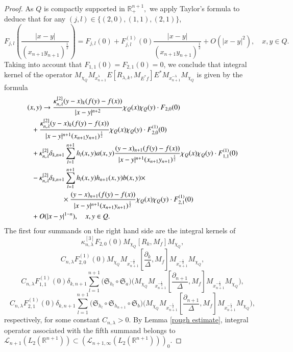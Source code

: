 \documentclass[12pt]{amsart}
\begin{document}
\begin{proof}
As $Q$ is compactly supported in $\mathbb{R}^{n+1}_+,$ we apply Taylor's formula to deduce that for any $(j,l)\in \{(2,0),(1,1),(2,1)\}$,
$$F_{j,l}(\frac{|x-y|}{(x_{n+1}y_{n+1})^{\frac12}})=F_{j,l}(0)+F_{j,l}^{(1)}(0)\frac{|x-y|}{(x_{n+1}y_{n+1})^{\frac12}}+O(|x-y|^2),\quad x,y\in Q.$$
Taking into account that $F_{1,1}(0)=F_{2,1}(0)=0$, we conclude that integral kernel of the operator $M_{\chi_Q} M_{x_{n+1}^{\lambda}}E[R_{\lambda,k},M_{E^{\ast}f}]E^{\ast}M_{x_{n+1}^{-\lambda}} M_{\chi_Q}$ is given by the formula
\begin{align*}
(x,y)&\to\frac{\kappa^{[2]}_{n,\lambda}(y-x)_k(f(y)-f(x))}{|x-y|^{n+2}}\chi_Q(x)\chi_Q(y)\cdot F_{2,0}(0)\\
&\hspace{-0.5cm}+\frac{\kappa^{[2]}_{n,\lambda}(y-x)_k(f(y)-f(x))}{|x-y|^{n+1}(x_{n+1}y_{n+1})^{\frac12}}\chi_Q(x)\chi_Q(y)\cdot F_{2,0}^{(1)}(0)\\
&\hspace{-0.5cm}+\kappa^{[2]}_{n,\lambda}\delta_{k,n+1}\sum_{l=1}^{n+1} h_l(x,y)a(x,y) \frac{(y-x)_{n+1}(f(y)-f(x))}{|x-y|^{n+1}(x_{n+1}y_{n+1})^{\frac12}}\chi_Q(x)\chi_Q(y)\cdot F_{1,1}^{(1)}(0)\\
&\hspace{-0.5cm}-\kappa^{[2]}_{n,\lambda}\delta_{k,n+1}\sum_{l=1}^{n+1} h_l(x,y)h_{n+1}(x,y)b(x,y)\times \\ &\hspace{1.0cm}\times\frac{(y-x)_{n+1}(f(y)-f(x))}{|x-y|^{n+1}(x_{n+1}y_{n+1})^{\frac12}}\chi_Q(x)\chi_Q(y)\cdot F_{2,1}^{(1)}(0)\\
&\hspace{-0.5cm}+O(|x-y|^{1-n}),\quad x,y\in Q.
\end{align*}
The first four summands on the right hand side are the integral kernels of
$$\kappa^{[3]}_{n,\lambda}F_{2,0}(0)M_{\chi_Q}[R_k,M_f]M_{\chi_Q},$$
$$C_{n,\lambda}F_{2,0}^{(1)}(0)M_{\chi_Q}M_{x_{n+1}^{-\frac12}}[\frac{\partial_k}{\Delta},M_f]M_{x_{n+1}^{-\frac12}}M_{\chi_Q},$$
$$C_{n,\lambda}F_{1,1}^{(1)}(0)\delta_{k,n+1}\sum_{l=1}^{n+1}\Big(\mathfrak{S}_{h_l}\circ\mathfrak{S}_a\Big)\Big(M_{\chi_Q}M_{x_{n+1}^{-\frac12}}[\frac{\partial_{n+1}}{\Delta},M_f]M_{x_{n+1}^{-\frac12}}M_{\chi_Q}\Big),$$
$$C_{n,\lambda}F_{2,1}^{(1)}(0)\delta_{k,n+1}\sum_{l=1}^{n+1}\Big(\mathfrak{S}_{h_l}\circ\mathfrak{S}_{h_{n+1}}\circ\mathfrak{S}_b\Big)\Big(M_{\chi_Q}M_{x_{n+1}^{-\frac12}}[\frac{\partial_{n+1}}{\Delta},M_f]M_{x_{n+1}^{-\frac12}}M_{\chi_Q}\Big),$$
respectively, for some constant $C_{n,\lambda}>0$. By Lemma \ref{rough estimate}, integral operator associated with the fifth summand belongs to  $\mathcal{L}_{n+1}(L_2(\mathbb{R}^{n+1}))\subset (\mathcal{L}_{n+1,\infty}(L_2(\mathbb{R}^{n+1})))_0.$


\end{proof}
\end{document}
